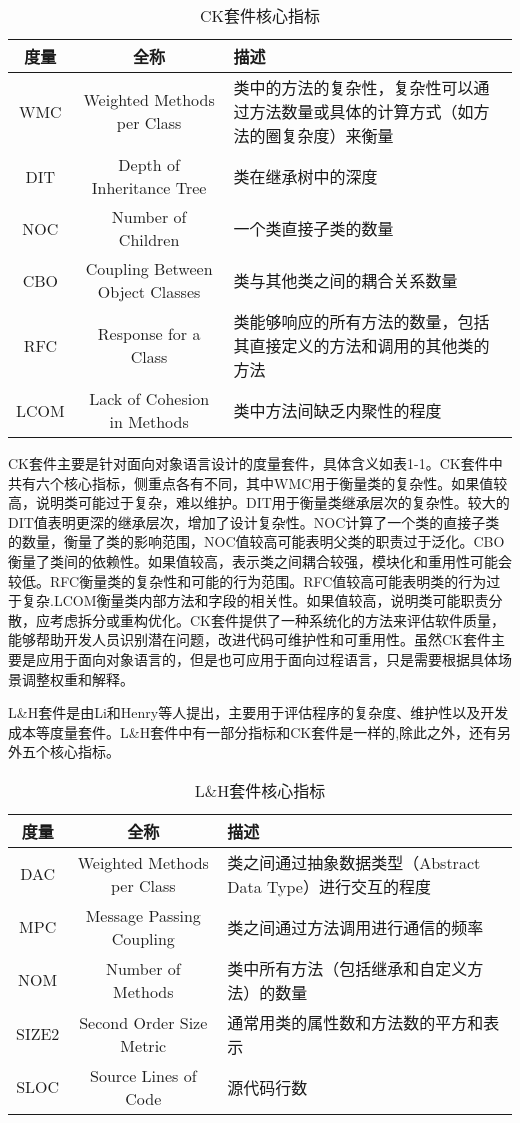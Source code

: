 \begin{table}[htbp]
\caption{CK套件核心指标}
\vspace{0.5em}\centering\wuhao
\begin{tabular}{ccp{7.5cm}}
\toprule
度量 & 全称 & 描述 \\
\midrule
WMC & Weighted Methods per Class & 类中的方法的复杂性，复杂性可以通过方法数量或具体的计算方式（如方法的圈复杂度）来衡量 \\
DIT & Depth of Inheritance Tree & 类在继承树中的深度 \\
NOC & Number of Children & 一个类直接子类的数量 \\
CBO & Coupling Between Object Classes & 类与其他类之间的耦合关系数量  \\
RFC & Response for a Class & 类能够响应的所有方法的数量，包括其直接定义的方法和调用的其他类的方法  \\
LCOM & Lack of Cohesion in Methods & 类中方法间缺乏内聚性的程度  \\
\bottomrule
\end{tabular}
\end{table}

CK套件主要是针对面向对象语言设计的度量套件，具体含义如表1-1。CK套件中共有六个核心指标，侧重点各有不同，其中WMC用于衡量类的复杂性。如果值较高，说明类可能过于复杂，难以维护。DIT用于衡量类继承层次的复杂性。较大的DIT值表明更深的继承层次，增加了设计复杂性。NOC计算了一个类的直接子类的数量，衡量了类的影响范围，NOC值较高可能表明父类的职责过于泛化。CBO衡量了类间的依赖性。如果值较高，表示类之间耦合较强，模块化和重用性可能会较低。RFC衡量类的复杂性和可能的行为范围。RFC值较高可能表明类的行为过于复杂.LCOM衡量类内部方法和字段的相关性。如果值较高，说明类可能职责分散，应考虑拆分或重构优化。CK套件提供了一种系统化的方法来评估软件质量，能够帮助开发人员识别潜在问题，改进代码可维护性和可重用性。虽然CK套件主要是应用于面向对象语言的，但是也可应用于面向过程语言，只是需要根据具体场景调整权重和解释。

L\&H套件是由Li和Henry等人提出\cite{1993Object}，主要用于评估程序的复杂度、维护性以及开发成本等度量套件。L&H套件中有一部分指标和CK套件是一样的,除此之外，还有另外五个核心指标。 

\begin{table}[htbp]
\caption{L\&H套件核心指标}
\vspace{0.5em}\centering\wuhao
\begin{tabular}{ccp{8cm}}
\toprule
度量 & 全称 & 描述 \\
\midrule
DAC & Weighted Methods per Class & 类之间通过抽象数据类型（Abstract Data Type）进行交互的程度 \\
MPC & Message Passing Coupling & 类之间通过方法调用进行通信的频率 \\
NOM & Number of Methods & 类中所有方法（包括继承和自定义方法）的数量 \\
SIZE2 & Second Order Size Metric & 通常用类的属性数和方法数的平方和表示  \\
SLOC & Source Lines of Code & 源代码行数  \\
\bottomrule
\end{tabular}
\end{table}

